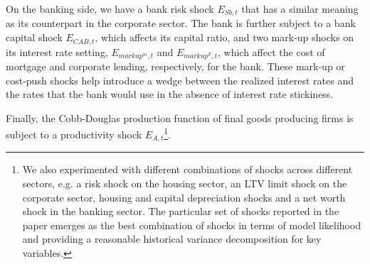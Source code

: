 \documentclass[12pt]{article}
\numberwithin{equation}{section}
\begin{document}
On the banking side, we have a bank risk shock $E_{Sb,t}$ that has a similar meaning  as its counterpart in the corporate sector. The bank is further subject to a bank capital shock $E_{CAB,t}$, which affects its capital ratio, and two mark-up shocks on its interest rate setting, $E_{markup^m,t}$ and $E_{markup^F,t}$, which affect the cost of mortgage and corporate lending, respectively, for the bank. These mark-up or cost-push shocks help introduce a wedge between the realized interest rates and the rates that the bank would use in the absence of interest rate stickiness. 

Finally, the Cobb-Douglas production function of final goods producing firms is subject to a productivity shock $E_{A,t}$\footnote{We also experimented with different combinations of shocks across different sectors, e.g. a risk shock on the housing sector, an LTV limit shock on the corporate sector, housing and capital depreciation shocks and a net worth shock in the banking sector. The particular set of shocks reported in the paper emerges as the best combination of shocks in terms of model likelihood and providing a reasonable historical variance decomposition for key variables.}. 



\end{document}
